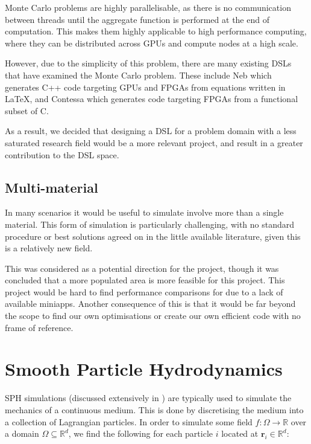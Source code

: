Monte Carlo problems are highly parallelisable, as there is no communication between threads until the aggregate function is performed at the end of computation. This makes them highly applicable to high performance computing, where they can be distributed across GPUs and compute nodes at a high scale.

However, due to the simplicity of this problem, there are many existing DSLs that have examined the Monte Carlo problem. These include Neb \cite{lindsey2016domain} which generates C++ code targeting GPUs and FPGAs from equations written in LaTeX, and Contessa \cite{thomas2007domain} which generates code targeting FPGAs from a functional subset of C.

As a result, we decided that designing a DSL for a problem domain with a less saturated research field would be a more relevant project, and result in a greater contribution to the DSL space.

\subsection{Multi-material}\label{sec-multimaterial}
In many scenarios it would be useful to simulate involve more than a single material. This form of simulation is particularly challenging, with no standard procedure or best solutions agreed on in the little available literature, given this is a relatively new field. 

This was considered as a potential direction for the project, though it was concluded that a more populated area is more feasible for this project. This project would be hard to find performance comparisons for due to a lack of available miniapps. Another consequence of this is that it would be far beyond the scope to find our own optimisations or create our own efficient code with no frame of reference.

\section{Smooth Particle Hydrodynamics}

SPH simulations (discussed extensively in \cite{monaghan2005sph}) are typically used to simulate the mechanics of a continuous medium. This is done by discretising the medium into a collection of Lagrangian particles. In order to simulate some field $f: \Omega \rightarrow \mathbb{R}$ over a domain $\Omega \subseteq \mathbb{R}^d$, we find the following for each particle $i$ located at $\textbf{r}_i \in \mathbb{R}^d$:

